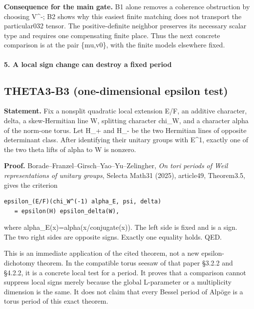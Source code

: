 \textbf{Consequence for the main gate.} B1 alone removes a coherence obstruction by choosing V\^{}-; B2 shows why this easiest finite matching does not transport the particular032 tensor. The positive-definite neighbor preserves its necessary scalar type and requires one compensating finite place. Thus the next concrete comparison is at the pair \{mu,v0\}, with the finite models elsewhere fixed.

\paragraph{5. A local sign change can destroy a fixed period}\label{a-local-sign-change-can-destroy-a-fixed-period}

\subsection{THETA3-B3 (one-dimensional epsilon test)}\label{theta3-b3-one-dimensional-epsilon-test}\label{B3}

\textbf{Statement.} Fix a nonsplit quadratic local extension E/F, an additive character, delta, a skew-Hermitian line W, splitting character chi\_W, and a character alpha of the norm-one torus. Let H\_+ and H\_- be the two Hermitian lines of opposite determinant class. After identifying their unitary groups with E\^{}1, exactly one of the two theta lifts of alpha to W is nonzero.

\textbf{Proof.} Borade--Franzel--Girsch--Yao--Yu--Zelingher, \emph{On tori periods of Weil representations of unitary groups}, Selecta Math31 (2025), article49, Theorem3.5, gives the criterion

\begin{verbatim}
epsilon_(E/F)(chi_W^(-1) alpha_E, psi, delta)
   = epsilon(H) epsilon_delta(W),
\end{verbatim}

where alpha\_E(x)=alpha(x/conjugate(x)). The left side is fixed and is a sign. The two right sides are opposite signs. Exactly one equality holds. QED.

This is an immediate application of the cited theorem, not a new epsilon-dichotomy theorem. In the compatible torus seesaw of that paper §3.2.2 and §4.2.2, it is a concrete local test for a period. It proves that a comparison cannot suppress local signs merely because the global L-parameter or a multiplicity dimension is the same. It does not claim that every Bessel period of Alpöge is a torus period of this exact theorem.


